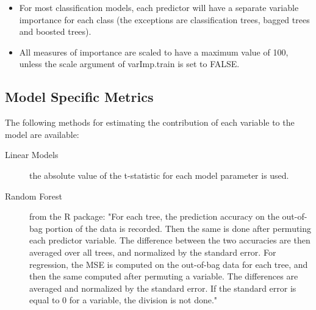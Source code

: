\documentclass[caret-main.tex]{subfiles}
\begin{document}
\begin{itemize}
\item For most classification models, each predictor will have a separate variable importance for each class (the exceptions are classification trees, bagged trees and boosted trees).
\item All measures of importance are scaled to have a maximum value of 100, unless the scale argument of varImp.train is set to FALSE.
\end{itemize}

\subsection*{Model Specific Metrics}
 
The following methods for estimating the contribution of each variable to the model are available:
 

\begin{description}
\item[Linear Models] the absolute value of the t-statistic for each model parameter is used.
\item[Random Forest] from the R package: "For each tree, the prediction accuracy on the out-of-bag portion of the data is recorded. Then the same is done after permuting each predictor variable. The difference between the two accuracies are then averaged over all trees, and normalized by the standard error. For regression, the MSE is computed on the out-of-bag data for each tree, and then the same computed after permuting a variable. The differences are averaged and normalized by the standard error. If the standard error is equal to 0 for a variable, the division is not done."
\end{description} 
\end{document}
